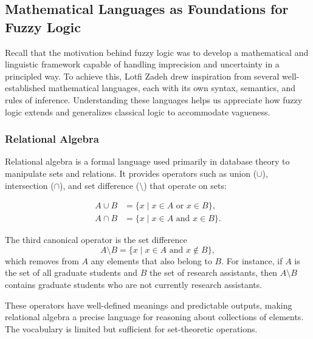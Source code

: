 \subsection{Mathematical Languages as Foundations for Fuzzy Logic}
\label{sec:softcomp_mathematical_languages_as_foundations_for_fuzzy_logic}

Recall that the motivation behind fuzzy logic was to develop a mathematical and linguistic framework capable of handling imprecision and uncertainty in a principled way. To achieve this, Lotfi Zadeh drew inspiration from several well-established mathematical languages, each with its own syntax, semantics, and rules of inference. Understanding these languages helps us appreciate how fuzzy logic extends and generalizes classical logic to accommodate vagueness.

\subsubsection{Relational Algebra}
\label{sec:softcomp_relational_algebra_sub}

Relational algebra is a formal language used primarily in database theory to manipulate sets and relations. It provides operators such as union ($\cup$), intersection ($\cap$), and set difference ($\setminus$) that operate on sets:

\begin{equation}
\begin{aligned}
A \cup B &= \{ x \mid x \in A \text{ or } x \in B \}, \\
A \cap B &= \{ x \mid x \in A \text{ and } x \in B \}.
\end{aligned}
\label{eq:softcomp_relational_union_intersection}
\end{equation}

The third canonical operator is the set difference
\begin{equation}
A \setminus B = \{ x \mid x \in A \text{ and } x \notin B \},
\label{eq:softcomp_relational_set_difference}
\end{equation}
which removes from \(A\) any elements that also belong to \(B\). For instance, if \(A\) is the set of all graduate students and \(B\) the set of research assistants, then \(A \setminus B\) contains graduate students who are not currently research assistants.

These operators have well-defined meanings and predictable outputs, making relational algebra a precise language for reasoning about collections of elements. The vocabulary is limited but sufficient for set-theoretic operations.

